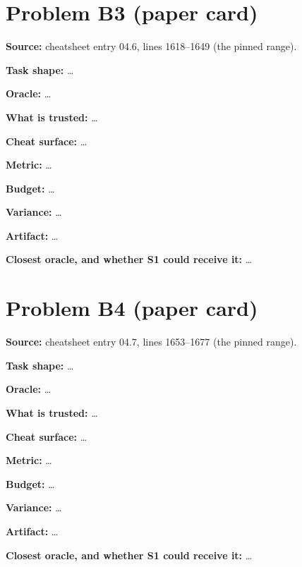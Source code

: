 \documentclass[11pt]{article}
\begin{document}
\section*{Problem B3 (paper card)}\label{ans:B3}
\begin{answer}
\textbf{Source:} cheatsheet entry 04.6, lines 1618--1649 (the pinned range).

\textbf{Task shape:} \dots

\textbf{Oracle:} \dots

\textbf{What is trusted:} \dots

\textbf{Cheat surface:} \dots

\textbf{Metric:} \dots

\textbf{Budget:} \dots

\textbf{Variance:} \dots

\textbf{Artifact:} \dots

\textbf{Closest oracle, and whether S1 could receive it:} \dots
\end{answer}

\section*{Problem B4 (paper card)}\label{ans:B4}
\begin{answer}
\textbf{Source:} cheatsheet entry 04.7, lines 1653--1677 (the pinned range).

\textbf{Task shape:} \dots

\textbf{Oracle:} \dots

\textbf{What is trusted:} \dots

\textbf{Cheat surface:} \dots

\textbf{Metric:} \dots

\textbf{Budget:} \dots

\textbf{Variance:} \dots

\textbf{Artifact:} \dots

\textbf{Closest oracle, and whether S1 could receive it:} \dots
\end{answer}

\end{document}
